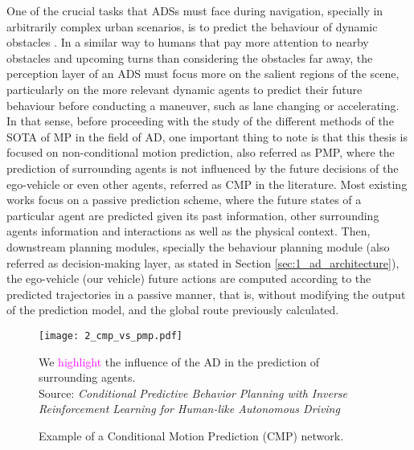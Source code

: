 One of the crucial tasks that \acp{ADS} must face during navigation, specially in arbitrarily complex urban scenarios, is to predict the behaviour of dynamic obstacles \cite{chang2019argoverse, salzmann2020trajectron++}. In a similar way to humans that pay more attention to nearby obstacles and upcoming turns than considering the obstacles far away, the perception layer of an \ac{ADS} must focus more on the salient regions of the scene, particularly on the more relevant dynamic agents to predict their future behaviour before conducting a maneuver, such as lane changing or accelerating. In that sense, before proceeding with the study of the different methods of the \ac{SOTA} of \ac{MP} in the field of \ac{AD}, one important thing to note is that this thesis is focused on non-conditional motion prediction, also referred as \ac{PMP}, where the prediction of surrounding agents is not influenced by the future decisions of the ego-vehicle or even other agents, referred as \ac{CMP} in the literature. Most existing works \cite{gilles2021home, gilles2022gohome, varadarajan2022multipath++, wang2022ganet, schmidt2022crat, liang2020learning} focus on a passive prediction scheme, where the future states of a particular agent are predicted given its past information, other surrounding agents information and interactions as well as the physical context. Then, downstream planning modules, specially the behaviour planning module (also referred as decision-making layer, as stated in Section \ref{sec:1_ad_architecture}), the ego-vehicle (our vehicle) future actions are computed according to the predicted trajectories in a passive manner, that is, without modifying the output of the prediction model, and the global route previously calculated. \\

\begin{figure}[h]
	\centering
	\texttt{[image: 2\_cmp\_vs\_pmp.pdf]}
	\caption{Example of a Conditional Motion Prediction (CMP) network.} We \textcolor{magenta}{highlight} the influence of the \ac{AD} in the prediction of surrounding agents. \\
	Source: \textit{Conditional Predictive Behavior Planning with Inverse Reinforcement Learning for Human-like Autonomous Driving} \cite{huang2023conditional}
	\label{fig:2_cmp_vs_pmp}
\end{figure}

